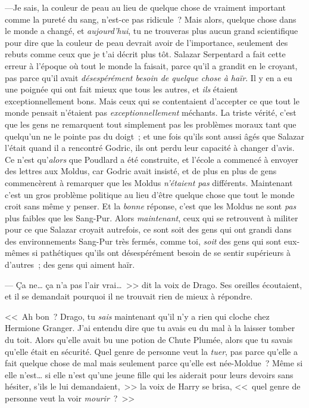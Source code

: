 ---Je sais, la couleur de peau au lieu de quelque chose de vraiment important comme la pureté du sang, n'est-ce pas ridicule~? Mais alors, quelque chose dans le monde a changé, et \emph{aujourd'hui}, tu ne trouveras plus aucun grand scientifique pour dire que la couleur de peau devrait avoir de l'importance, seulement des rebuts comme ceux que je t'ai décrit plus tôt. Salazar Serpentard a fait cette erreur à l'époque où tout le monde la faisait, parce qu'il a grandit en le croyant, pas parce qu'il avait \emph{désespérément besoin de quelque chose à haïr}. Il y en a eu une poignée qui ont fait mieux que tous les autres, et \emph{ils} étaient exceptionnellement bons. Mais ceux qui se contentaient d'accepter ce que tout le monde pensait n'étaient pas \emph{exceptionnellement} méchants. La triste vérité, c'est que les gens ne remarquent tout simplement pas les problèmes moraux tant que quelqu'un ne le pointe pas du doigt~; et une fois qu'ils sont aussi âgés que Salazar l'était quand il a rencontré Godric, ils ont perdu leur capacité à changer d'avis. Ce n'est qu'\emph{alors} que Poudlard a été construite, et l'école a commencé à envoyer des lettres aux Moldus, car Godric avait insisté, et de plus en plus de gens commencèrent à remarquer que les Moldus \emph{n'étaient pas} différents. Maintenant c'est un gros problème politique au lieu d'être quelque chose que tout le monde croit sans même y penser. Et la \emph{bonne} réponse, c'est que les Moldus ne sont \emph{pas} plus faibles que les Sang-Pur. Alors \emph{maintenant}, ceux qui se retrouvent à militer pour ce que Salazar croyait autrefois, ce sont soit des gens qui ont grandi dans des environnements Sang-Pur très fermés, comme toi, \emph{soit} des gens qui sont eux-mêmes si pathétiques qu'ils ont désespérément besoin de se sentir supérieurs à d'autres~; des gens qui aiment haïr.

--- Ça ne… ça n'a pas l'air vrai…~>> dit la voix de Drago. Ses oreilles écoutaient, et il se demandait pourquoi il ne trouvait rien de mieux à répondre.

<<~Ah bon~? Drago, tu \emph{sais} maintenant qu'il n'y a rien qui cloche chez Hermione Granger. J'ai entendu dire que tu avais eu du mal à la laisser tomber du toit. Alors qu'elle avait bu une potion de Chute Plumée, alors que tu savais qu'elle était en sécurité. Quel genre de personne veut la \emph{tuer}, pas parce qu'elle a fait quelque chose de mal mais seulement parce qu'elle est née-Moldue~? Même si elle n'est… si elle n'est qu'une jeune fille qui les aiderait pour leurs devoirs sans hésiter, s'ils le lui demandaient,~>> la voix de Harry se brisa, <<~quel genre de personne veut la voir \emph{mourir}~?~>>

